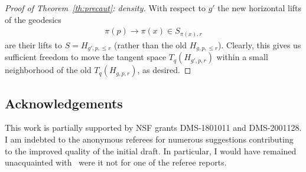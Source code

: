 \documentclass[10pt,a4paper]{amsart}
\numberwithin{equation}{section}
\begin{document}
\begin{proof}[Proof of Theorem~\ref{th:precaut}: density]
 With respect to $g'$ the new horizontal lifts of the geodesics
 \begin{gather*}
 \pi(p)\to \pi(x)\in S_{\pi(x),r}
 \end{gather*}
 are their lifts to $S=H_{g',p,\le r}$ (rather than the old $H_{g,p,\le r}$). Clearly, this gives us sufficient freedom to move the tangent space $T_q(H_{g',p,r})$ within a small neighborhood of the old $T_q(H_{g,p,r})$, as desired.
\end{proof}



\subsection*{Acknowledgements}

This work is partially supported by NSF grants DMS-1801011 and DMS-2001128.
I am indebted to the anonymous referees for numerous suggestions contributing to the improved quality of the initial draft. In particular, I would have remained unacquainted with~\cite{bd,sz} were it not for one of the referee reports.

\end{document}

